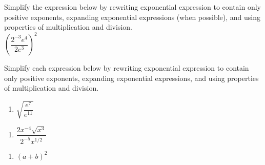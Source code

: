 \documentclass[10pt]{article}
\begin{document}
 Simplify the expression below by rewriting exponential expression to contain only positive exponents, expanding exponential expressions (when possible), and using properties of multiplication and division.\\

$\left( \dfrac{ 2^{-3}e^4 }{ 2e^3 } \right)^2$

{
\blue{\[\left( \dfrac{ 2^{-3}e^4 }{ 2e^3 } \right)^2 = \left( \dfrac{ e^{4-3} }{ 2\cdot2^{3} } \right)^2 = \left( \dfrac{ e }{ 2^{1+3} } \right)^2 = \left( \dfrac{ e }{ 2^4 } \right)\cdot\left( \dfrac{ e }{ 2^4 } \right) = \dfrac{ e^{1+1} }{ 2^{4+4} } = \fbox{$\dfrac{e^2}{2^8}$}\]
}}

 Simplify each expression below by rewriting exponential expression to contain only positive exponents, expanding exponential expressions, and using properties of multiplication and division.

\begin{enumerate}
\item[(a)] $\sqrt{\dfrac{ e^{7} }{ e^{11} }}$
\end{enumerate}

{
\blue{\[\sqrt{\dfrac{ e^{7} }{ e^{11} }} = \left(e^{7-11}\right)^{1/2} = \left(e^{-4}\right)^{1/2} = e^{-4\cdot\frac12} = e^{-2} = \fbox{$\dfrac1{e^2}$}\]
}}

\begin{enumerate}
\item[(b)] $\dfrac{ 2x^{-4}\sqrt{x^{3}} }{ 2^{-5}x^{1/2} }$
\end{enumerate}

{
\blue{\[
\dfrac{ 2x^{-4}\sqrt{x^{3}} }{ 2^{-5}x^{1/2} } 
= 
\dfrac{2^{1-(-5)}\cdot x^{3/2}}{x^4x^{1/2}} 
= 
\dfrac{2^6}{x^{4+\frac12}x^{-3/2}}
=
\fbox{$\dfrac{64}{x^3}$}
\]
}}

\begin{enumerate}
\item[(c)] $(a+b)^2$
\end{enumerate}

{
\blue{\[
(a+b)^2 = \underbrace{(a+b)\cdot(a+b)}_{2\text{ copies}} = \underset{F}{a^2}+\underset{O}{ab}+\underset{I}{ba}+\underset{L}{b^2} = \fbox{$a^2+2ab+b^2$}
\]
}}

\end{document}
